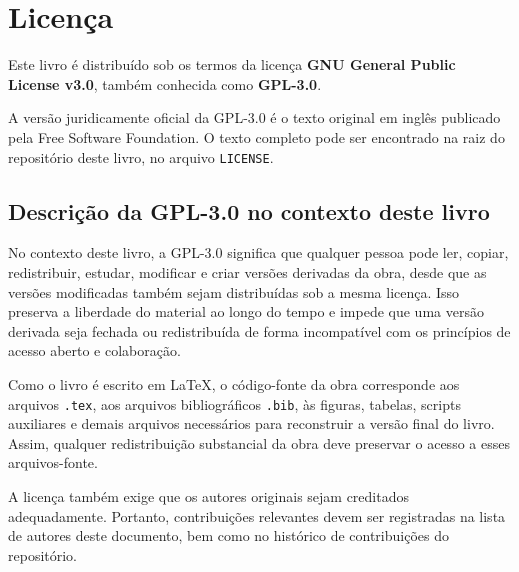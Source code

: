 \documentclass[12pt,openany]{book}
\newcommand{\placeholder}[1]{
    \par\medskip
    \noindent\textit{#1}
    \par\medskip
}
\begin{document}

\cleardoublepage
\chapter*{Licença}

Este livro é distribuído sob os termos da licença \textbf{GNU General Public License v3.0}, também conhecida como \textbf{GPL-3.0}.

A versão juridicamente oficial da GPL-3.0 é o texto original em inglês publicado pela Free Software Foundation. O texto completo pode ser encontrado na raiz do repositório deste livro, no arquivo \texttt{LICENSE}. %



\section*{Descrição da GPL-3.0 no contexto deste livro}

No contexto deste livro, a GPL-3.0 significa que qualquer pessoa pode ler, copiar, redistribuir, estudar, modificar e criar versões derivadas da obra, desde que as versões modificadas também sejam distribuídas sob a mesma licença. Isso preserva a liberdade do material ao longo do tempo e impede que uma versão derivada seja fechada ou redistribuída de forma incompatível com os princípios de acesso aberto e colaboração.

Como o livro é escrito em LaTeX, o código-fonte da obra corresponde aos arquivos \texttt{.tex}, aos arquivos bibliográficos \texttt{.bib}, às figuras, tabelas, scripts auxiliares e demais arquivos necessários para reconstruir a versão final do livro. Assim, qualquer redistribuição substancial da obra deve preservar o acesso a esses arquivos-fonte.

A licença também exige que os autores originais sejam creditados adequadamente. Portanto, contribuições relevantes devem ser registradas na lista de autores deste documento, bem como no histórico de contribuições do repositório.
\end{document}
